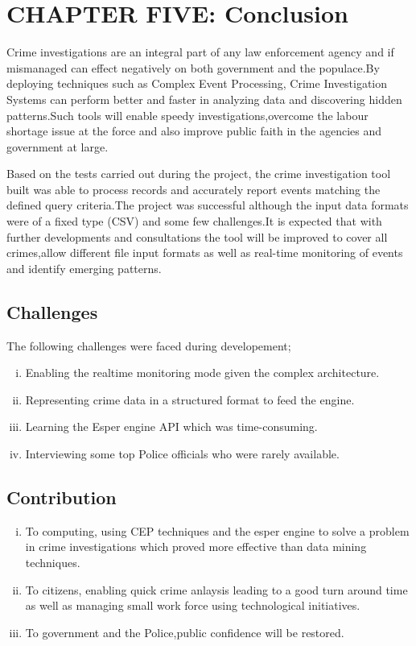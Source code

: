

\section{CHAPTER FIVE: Conclusion }

\noindent Crime investigations are an integral part of any law enforcement agency and if mismanaged can effect negatively on both government and the populace.By deploying techniques such as Complex Event Processing, Crime Investigation Systems can perform better and faster in analyzing data and discovering hidden patterns.Such tools will enable speedy investigations,overcome the labour shortage issue at the force and also improve public faith in the agencies and government at large.

\noindent Based on the tests carried out during the project, the crime investigation tool built was able to process records and accurately report events matching the defined query criteria.The project was successful although the input data formats were of a fixed type (CSV) and some few challenges.It is expected that with further developments and consultations the tool will be improved to cover all crimes,allow different file input formats as well as real-time monitoring of events and identify emerging patterns.

\subsection{Challenges}

\noindent The following challenges were faced during developement;

\begin{enumerate}[(i)]
\item Enabling the realtime monitoring mode given the complex architecture.
\item Representing crime data in a structured format to feed the engine.
\item Learning the Esper engine API which was time-consuming.
\item Interviewing some top Police officials who were rarely available.


\end{enumerate}

\subsection{Contribution}


\begin{enumerate}[(i)]
\item To computing, using CEP techniques and the esper engine to solve a problem in crime investigations which proved more effective than data mining techniques.
\item To citizens, enabling quick crime anlaysis leading to a good turn around time as well as managing small work force using technological initiatives.
\item To government and the Police,public confidence will be restored.


\end{enumerate}

